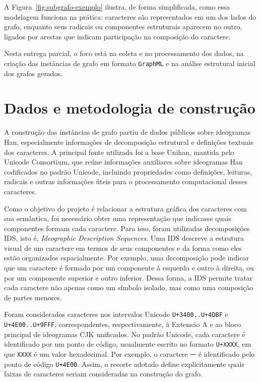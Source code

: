 \documentclass[10pt, a4paper]{extarticle}
\begin{document}
A Figura~\ref{fig:subgrafo-exemplo} ilustra, de forma simplificada, como essa modelagem funciona na prática: caracteres são representados em um dos lados do grafo, enquanto seus radicais ou componentes estruturais aparecem no outro, ligados por arestas que indicam participação na composição do caractere.

Nesta entrega parcial, o foco está na coleta e no processamento dos dados, na criação das instâncias de grafo em formato \texttt{GraphML} e na análise estrutural inicial dos grafos gerados.

\section{Dados e metodologia de construção}

A construção das instâncias de grafo partiu de dados públicos sobre ideogramas Han, especialmente informações de decomposição estrutural e definições textuais dos caracteres. A principal fonte utilizada foi a base Unihan, mantida pelo Unicode Consortium, que reúne informações auxiliares sobre ideogramas Han codificados no padrão Unicode, incluindo propriedades como definições, leituras, radicais e outras informações úteis para o processamento computacional desses caracteres.

Como o objetivo do projeto é relacionar a estrutura gráfica dos caracteres com sua semântica, foi necessário obter uma representação que indicasse quais componentes formam cada caractere. Para isso, foram utilizadas decomposições IDS, isto é, \textit{Ideographic Description Sequences}. Uma IDS descreve a estrutura visual de um caractere em termos de seus componentes e da forma como eles estão organizados espacialmente. Por exemplo, uma decomposição pode indicar que um caractere é formado por um componente à esquerda e outro à direita, ou por um componente superior e outro inferior. Dessa forma, a IDS permite tratar cada caractere não apenas como um símbolo isolado, mas como uma composição de partes menores.

Foram considerados caracteres nos intervalos Unicode \texttt{U+3400..U+4DBF} e \texttt{U+4E00..U+9FFF}, correspondentes, respectivamente, à Extensão A e ao bloco principal de ideogramas CJK unificados. No padrão Unicode, cada caractere é identificado por um ponto de código, usualmente escrito no formato \texttt{U+XXXX}, em que \texttt{XXXX} é um valor hexadecimal. Por exemplo, o caractere \texttt{一} é identificado pelo ponto de código \texttt{U+4E00}. Assim, o recorte adotado define explicitamente quais faixas de caracteres seriam consideradas na construção do grafo. 
\end{document}
